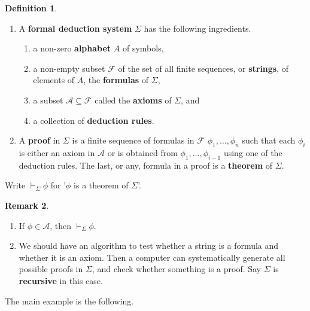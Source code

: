 \documentclass{article}
\theoremstyle{definition}\newtheorem{definition}{Definition}[subsection]
\theoremstyle{definition}\newtheorem{remark}[definition]{Remark}
\theoremstyle{definition}\newtheorem*{example}{Example}
\theoremstyle{definition}\newtheorem*{note}{Note}
\begin{document}
\begin{definition}
\hfill
\begin{enumerate}
\item A \textbf{formal deduction system} $ \Sigma $ has the following ingredients.
\begin{enumerate}
\item a non-zero \textbf{alphabet} $ A $ of symbols,
\item a non-empty subset $ \mathcal{F} $ of the set of all finite sequences, or \textbf{strings}, of elements of $ A $, the \textbf{formulas} of $ \Sigma $,
\item a subset $ \mathcal{A} \subseteq \mathcal{F} $ called the \textbf{axioms} of $ \Sigma $, and
\item a collection of \textbf{deduction rules}.
\end{enumerate}
\item A \textbf{proof} in $ \Sigma $ is a finite sequence of formulas in $ \mathcal{F} $ $ \phi_1, \dots, \phi_n $ such that each $ \phi_i $ is either an axiom in $ \mathcal{A} $ or is obtained from $ \phi_1, \dots, \phi_{i - 1} $ using one of the deduction rules. The last, or any, formula in a proof is a \textbf{theorem} of $ \Sigma $.
\end{enumerate}
Write $ \vdash_\Sigma \phi $ for '$ \phi $ is a theorem of $ \Sigma $'.
\end{definition}

\begin{remark}
\hfill
\begin{enumerate}
\item If $ \phi \in \mathcal{A} $, then $ \vdash_\Sigma \phi $.
\item We should have an algorithm to test whether a string is a formula and whether it is an axiom. Then a computer can systematically generate all possible proofs in $ \Sigma $, and check whether something is a proof. Say $ \Sigma $ is \textbf{recursive} in this case.
\end{enumerate}
\end{remark}

The main example is the following.
\end{document}

